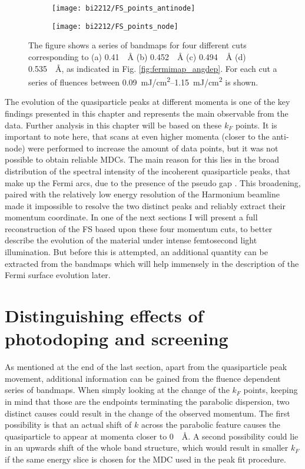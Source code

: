 \begin{figure}[b!]
	\centering
	\begin{subfigure}[b]{0.49\textwidth}
		\texttt{[image: bi2212/FS\_points\_antinode]}
		\caption{}
	\end{subfigure}
	\hfill
	\begin{subfigure}[b]{0.49\textwidth}
		\texttt{[image: bi2212/FS\_points\_node]}
		\caption{}
	\end{subfigure}
	\caption{The figure shows a series of bandmaps for four different cuts corresponding to (a) \qty{0.41}{\per\angstrom} (b) \qty{0.452}{\per\angstrom} (c) \qty{0.494}{\per\angstrom} (d) \qty{0.535}{\per\angstrom}, as indicated in Fig. \ref{fig:fermimap_angdep}. For each cut a series of fluences between \qtyrange{0.09}{1.15}{\milli\joule/\centi\meter\squared} is shown.}
	\label{fig:FS_points_zoom}
\end{figure}

The evolution of the quasiparticle peaks at different momenta is one of the key findings presented in this chapter and represents the main observable from the data.
Further analysis in this chapter will be based on these $k_F$ points.
It is important to note here, that scans at even higher momenta (closer to the anti-node) were performed to increase the amount of data points, but it was not possible to obtain reliable MDCs.
The main reason for this lies in the broad distribution of the spectral intensity of the incoherent quasiparticle peaks, that make up the Fermi arcs, due to the presence of the pseudo gap \cite{norman_destruction_1998}.
This broadening, paired with the relatively low energy resolution of the Harmonium beamline made it impossible to resolve the two distinct peaks and reliably extract their momentum coordinate.
In one of the next sections I will present a full reconstruction of the FS based upon these four momentum cuts, to better describe the evolution of the material under intense femtosecond light illumination.
But before this is attempted, an additional quantity can be extracted from the bandmaps which will help immensely in the description of the Fermi surface evolution later.


\section{Distinguishing effects of photodoping and screening}
\label{sec:mu}

As mentioned at the end of the last section, apart from the quasiparticle peak movement, additional information can be gained from the fluence dependent series of bandmaps.
When simply looking at the change of the $k_F$ points, keeping in mind that those are the endpoints terminating the parabolic dispersion, two distinct causes could result in the change of the observed momentum.
The first possibility is that an actual shift of $k$ across the parabolic feature causes the quasiparticle to appear at momenta closer to \qty{0}{\per\angstrom}.
A second possibility could lie in an upwards shift of the whole band structure, which would result in smaller $k_F$ if the same energy slice is chosen for the MDC used in the peak fit procedure.

